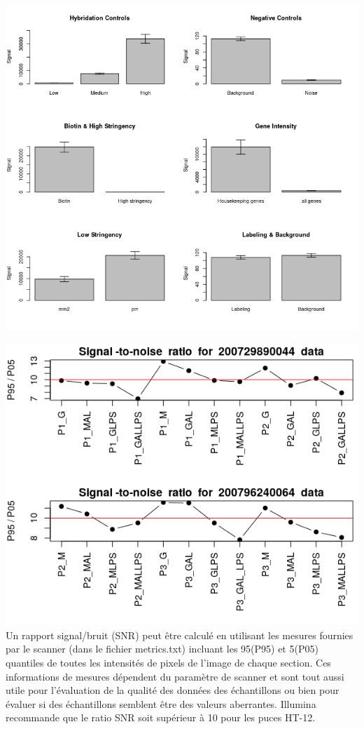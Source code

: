 \documentclass[a4paper,10pt]{article}
\begin{document}
\begin{center}
 \includegraphics[scale=0.7]{../../R/output/SummaryControl.png}
\end{center}
\begin{center}
 \includegraphics[scale=0.5]{../../R/output/signal_to_noise.png}
 Un rapport signal/bruit (SNR) peut être calculé en utilisant les mesures fournies par le scanner (dans le fichier metrics.txt) incluant les 95(P95) et 5(P05) quantiles de toutes les intensités de pixels de  l’image de chaque section. 
 Ces informations de mesures dépendent du paramètre de scanner et sont tout aussi utile pour l’évaluation de la qualité des données des échantillons ou bien pour évaluer si des échantillons semblent être des valeurs aberrantes. 
 Illumina recommande que le ratio SNR soit supérieur à 10 pour les puces HT-12.
 \label{SNR}
\end{center}
\end{document}
